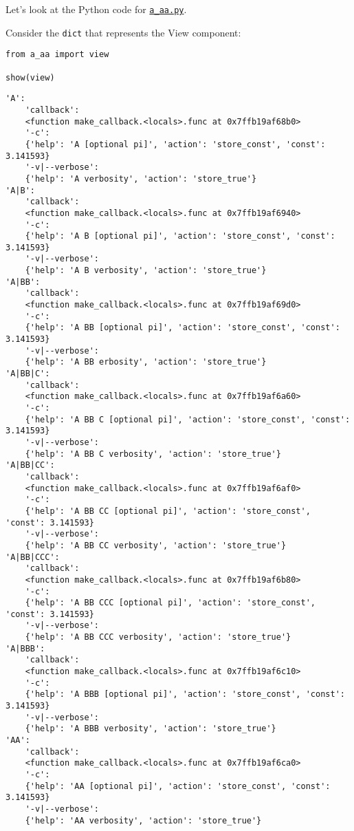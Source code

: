 \documentclass[10pt]{amsart}
\numberwithin{equation}{section}
\begin{document}
Let's look at the Python code for \href{https://github.com/tharte/parsearg/blob/master/parsearg/examples/a\_aa.py}{\texttt{a\_aa.py}}.

Consider the \texttt{dict} that represents the View component:
\begin{verbatim}
from a_aa import view

show(view)
\end{verbatim}

\begin{verbatim}
'A':
    'callback':
    <function make_callback.<locals>.func at 0x7ffb19af68b0>
    '-c':
    {'help': 'A [optional pi]', 'action': 'store_const', 'const': 3.141593}
    '-v|--verbose':
    {'help': 'A verbosity', 'action': 'store_true'}
'A|B':
    'callback':
    <function make_callback.<locals>.func at 0x7ffb19af6940>
    '-c':
    {'help': 'A B [optional pi]', 'action': 'store_const', 'const': 3.141593}
    '-v|--verbose':
    {'help': 'A B verbosity', 'action': 'store_true'}
'A|BB':
    'callback':
    <function make_callback.<locals>.func at 0x7ffb19af69d0>
    '-c':
    {'help': 'A BB [optional pi]', 'action': 'store_const', 'const': 3.141593}
    '-v|--verbose':
    {'help': 'A BB erbosity', 'action': 'store_true'}
'A|BB|C':
    'callback':
    <function make_callback.<locals>.func at 0x7ffb19af6a60>
    '-c':
    {'help': 'A BB C [optional pi]', 'action': 'store_const', 'const': 3.141593}
    '-v|--verbose':
    {'help': 'A BB C verbosity', 'action': 'store_true'}
'A|BB|CC':
    'callback':
    <function make_callback.<locals>.func at 0x7ffb19af6af0>
    '-c':
    {'help': 'A BB CC [optional pi]', 'action': 'store_const', 'const': 3.141593}
    '-v|--verbose':
    {'help': 'A BB CC verbosity', 'action': 'store_true'}
'A|BB|CCC':
    'callback':
    <function make_callback.<locals>.func at 0x7ffb19af6b80>
    '-c':
    {'help': 'A BB CCC [optional pi]', 'action': 'store_const', 'const': 3.141593}
    '-v|--verbose':
    {'help': 'A BB CCC verbosity', 'action': 'store_true'}
'A|BBB':
    'callback':
    <function make_callback.<locals>.func at 0x7ffb19af6c10>
    '-c':
    {'help': 'A BBB [optional pi]', 'action': 'store_const', 'const': 3.141593}
    '-v|--verbose':
    {'help': 'A BBB verbosity', 'action': 'store_true'}
'AA':
    'callback':
    <function make_callback.<locals>.func at 0x7ffb19af6ca0>
    '-c':
    {'help': 'AA [optional pi]', 'action': 'store_const', 'const': 3.141593}
    '-v|--verbose':
    {'help': 'AA verbosity', 'action': 'store_true'}

\end{verbatim}
\end{document}
